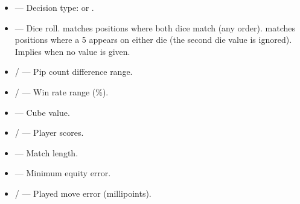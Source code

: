 \documentclass[letterpaper,10pt,english]{sphinxmanual}
\begin{document}
\sphinxAtStartPar
{}
\begin{itemize}
\item {} 
\sphinxAtStartPar
{} — Decision type:  or .

\item {} 
\sphinxAtStartPar
{} — Dice roll.  matches positions where both dice match (any order).  matches positions where a 5 appears on either die (the second die value is ignored). Implies  when no  value is given.

\item {} 
\sphinxAtStartPar
{} /  — Pip count difference range.

\item {} 
\sphinxAtStartPar
{} /  — Win rate range (\%).

\item {} 
\sphinxAtStartPar
{} — Cube value.

\item {} 
\sphinxAtStartPar
{} /  — Player scores.

\item {} 
\sphinxAtStartPar
{} — Match length.

\item {} 
\sphinxAtStartPar
{} — Minimum equity error.

\item {} 
\sphinxAtStartPar
{} /  — Played move error (millipoints).


\end{itemize}
\end{document}
